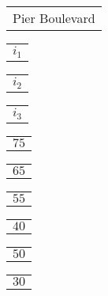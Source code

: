 \documentclass{book}
\begin{document}
\stopmpxshipout
\mpxshipout%
{\small \renewcommand{\arraystretch}{.9}
              \circuitfont\begin{tabular}{@{}l@{}}
                  Pier Boulevard   
              \end{tabular}}%
\stopmpxshipout
\mpxshipout%
{\small \renewcommand{\arraystretch}{.9}
              \circuitfont\begin{tabular}{@{}c@{}}
                  $i_1$
              \end{tabular}}%
\stopmpxshipout
\mpxshipout%
{\small \renewcommand{\arraystretch}{.9}
              \circuitfont\begin{tabular}{@{}r@{}}
                  $i_2$
              \end{tabular}}%
\stopmpxshipout
\mpxshipout%
{\small \renewcommand{\arraystretch}{.9}
              \circuitfont\begin{tabular}{@{}l@{}}
                  $i_3$
              \end{tabular}}%
\stopmpxshipout
\mpxshipout%
{\tiny \renewcommand{\arraystretch}{.9}
              \circuitfont\begin{tabular}{@{}r@{}}
                  $75$     
              \end{tabular}}%
\stopmpxshipout
\mpxshipout%
{\tiny \renewcommand{\arraystretch}{.9}
              \circuitfont\begin{tabular}{@{}c@{}}
                  $65$     
              \end{tabular}}%
\stopmpxshipout
\mpxshipout%
{\tiny \renewcommand{\arraystretch}{.9}
              \circuitfont\begin{tabular}{@{}c@{}}
                  $55$     
              \end{tabular}}%
\stopmpxshipout
\mpxshipout%
{\tiny \renewcommand{\arraystretch}{.9}
              \circuitfont\begin{tabular}{@{}l@{}}
                  $40$     
              \end{tabular}}%
\stopmpxshipout
\mpxshipout%
{\tiny \renewcommand{\arraystretch}{.9}
              \circuitfont\begin{tabular}{@{}l@{}}
                  $50$     
              \end{tabular}}%
\stopmpxshipout
\mpxshipout%
{\tiny \renewcommand{\arraystretch}{.9}
              \circuitfont\begin{tabular}{@{}l@{}}
                  $30$     
              \end{tabular}}%
\end{document}
